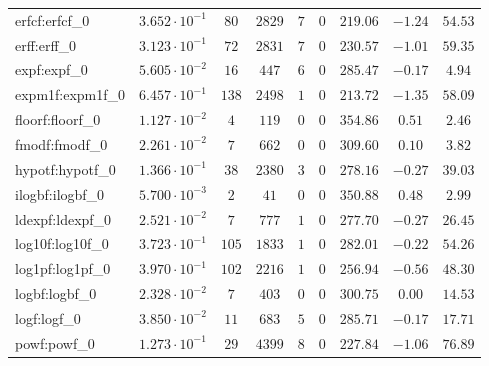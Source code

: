 \begin{tabular}{|l|c|c|c|c|c|c|c|c|}
erfcf:erfcf\_0               & $ 3.652 \cdot 10^{-1} $ & $ 80     $ & $ 2829  $ & $ 7   $ & $ 0   $ & $ 219.06      $ & $ -1.24   $ & $ 54.53   $ \\
erff:erff\_0                 & $ 3.123 \cdot 10^{-1} $ & $ 72     $ & $ 2831  $ & $ 7   $ & $ 0   $ & $ 230.57      $ & $ -1.01   $ & $ 59.35   $ \\
expf:expf\_0                 & $ 5.605 \cdot 10^{-2} $ & $ 16     $ & $ 447   $ & $ 6   $ & $ 0   $ & $ 285.47      $ & $ -0.17   $ & $ 4.94    $ \\
expm1f:expm1f\_0             & $ 6.457 \cdot 10^{-1} $ & $ 138    $ & $ 2498  $ & $ 1   $ & $ 0   $ & $ 213.72      $ & $ -1.35   $ & $ 58.09   $ \\
floorf:floorf\_0             & $ 1.127 \cdot 10^{-2} $ & $ 4      $ & $ 119   $ & $ 0   $ & $ 0   $ & $ 354.86      $ & $ 0.51    $ & $ 2.46    $ \\
fmodf:fmodf\_0               & $ 2.261 \cdot 10^{-2} $ & $ 7      $ & $ 662   $ & $ 0   $ & $ 0   $ & $ 309.60      $ & $ 0.10    $ & $ 3.82    $ \\
hypotf:hypotf\_0             & $ 1.366 \cdot 10^{-1} $ & $ 38     $ & $ 2380  $ & $ 3   $ & $ 0   $ & $ 278.16      $ & $ -0.27   $ & $ 39.03   $ \\
ilogbf:ilogbf\_0             & $ 5.700 \cdot 10^{-3} $ & $ 2      $ & $ 41    $ & $ 0   $ & $ 0   $ & $ 350.88      $ & $ 0.48    $ & $ 2.99    $ \\
ldexpf:ldexpf\_0             & $ 2.521 \cdot 10^{-2} $ & $ 7      $ & $ 777   $ & $ 1   $ & $ 0   $ & $ 277.70      $ & $ -0.27   $ & $ 26.45   $ \\
log10f:log10f\_0             & $ 3.723 \cdot 10^{-1} $ & $ 105    $ & $ 1833  $ & $ 1   $ & $ 0   $ & $ 282.01      $ & $ -0.22   $ & $ 54.26   $ \\
log1pf:log1pf\_0             & $ 3.970 \cdot 10^{-1} $ & $ 102    $ & $ 2216  $ & $ 1   $ & $ 0   $ & $ 256.94      $ & $ -0.56   $ & $ 48.30   $ \\
logbf:logbf\_0               & $ 2.328 \cdot 10^{-2} $ & $ 7      $ & $ 403   $ & $ 0   $ & $ 0   $ & $ 300.75      $ & $ 0.00    $ & $ 14.53   $ \\
logf:logf\_0                 & $ 3.850 \cdot 10^{-2} $ & $ 11     $ & $ 683   $ & $ 5   $ & $ 0   $ & $ 285.71      $ & $ -0.17   $ & $ 17.71   $ \\
powf:powf\_0                 & $ 1.273 \cdot 10^{-1} $ & $ 29     $ & $ 4399  $ & $ 8   $ & $ 0   $ & $ 227.84      $ & $ -1.06   $ & $ 76.89   $ \\

\end{tabular}
